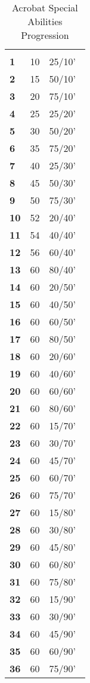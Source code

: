 \begin{multicols*}{2}
\begin {table}[H]
  \caption{Acrobat Special Abilities Progression}\label{tab:Acrobat Special Abilities Progression}
  \begin{tabularx}{\columnwidth}{>{\bfseries}YYY}
		 &  & \\
		1 & 10 & 25/10’\\
		2 & 15 & 50/10’\\
		3 & 20 & 75/10’\\
		4 & 25 & 25/20’\\
		5 & 30 & 50/20’\\
		6 & 35 & 75/20’\\
		7 & 40 & 25/30’\\
		8 & 45 & 50/30’\\
		9 & 50 & 75/30’\\
		10 & 52 & 20/40’\\
		11 & 54 & 40/40’\\
		12 & 56 & 60/40’\\
		13 & 60 & 80/40’\\
		14 & 60 & 20/50’\\
		15 & 60 & 40/50’\\
		16 & 60 & 60/50’\\
		17 & 60 & 80/50’\\
		18 & 60 & 20/60’\\
		19 & 60 & 40/60’\\
		20 & 60 & 60/60’\\
		21 & 60 & 80/60’\\
		22 & 60 & 15/70’\\
		23 & 60 & 30/70’\\
		24 & 60 & 45/70’\\
		25 & 60 & 60/70’\\
		26 & 60 & 75/70’\\
		27 & 60 & 15/80’\\
		28 & 60 & 30/80’\\
		29 & 60 & 45/80’\\
		30 & 60 & 60/80’\\
		31 & 60 & 75/80’\\
		32 & 60 & 15/90’\\
		33 & 60 & 30/90’\\
		34 & 60 & 45/90’\\
		35 & 60 & 60/90’\\
		36 & 60 & 75/90’\
  \end {tabularx}
\end {table}


\end{multicols*}
